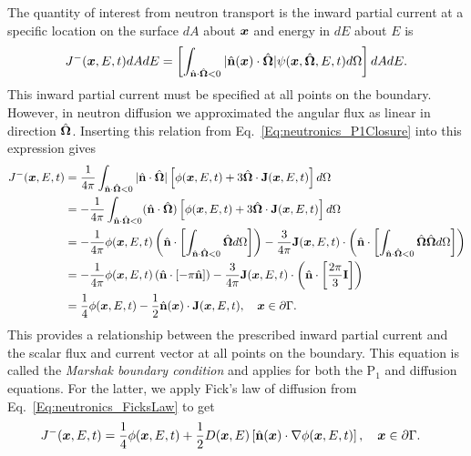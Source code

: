 The quantity of interest from neutron transport is the inward partial current at a specific location on the surface $dA$ about $\bm{x}$ and energy in $dE$ about $E$ is
\begin{align}
  J^-(\bm{x}, E, t) dA dE = \left[ \int_{\hat{\mathbf{n}} \cdot \hat{\mathbf{\Omega}} < 0} | \hat{\mathbf{n}}(\bm{x}) \cdot \hat{\mathbf{\Omega}} | \psi(\bm{x},\hat{\mathbf{\Omega}},E,t) d\Omega \right] dA dE .
\end{align} 
This inward partial current must be specified at all points on the boundary. However, in neutron diffusion we approximated the angular flux as linear in direction $\hat{\mathbf{\Omega}}$. Inserting this relation from Eq.~\eqref{Eq:neutronics_P1Closure} into this expression gives
\begin{align}
  J^-(\bm{x}, E, t) &= \frac{1}{4\pi} \int_{\hat{\mathbf{n}} \cdot \hat{\mathbf{\Omega}} < 0} | \hat{\mathbf{n}} \cdot \hat{\mathbf{\Omega}} |  \left[ \phi(\bm{x},E,t) + 3 \hat{\mathbf{\Omega}} \cdot \mathbf{J}(\bm{x},E,t) \right] d\Omega  \nonumber \\
  &= -\frac{1}{4\pi} \int_{\hat{\mathbf{n}} \cdot \hat{\mathbf{\Omega}} < 0} ( \hat{\mathbf{n}} \cdot \hat{\mathbf{\Omega}} )  \left[ \phi(\bm{x},E,t) + 3 \hat{\mathbf{\Omega}} \cdot \mathbf{J}(\bm{x},E,t) \right] d\Omega  \nonumber \\
  &= -\frac{1}{4\pi} \phi(\bm{x},E,t) \left( \hat{\mathbf{n}} \cdot \left[ \int_{\hat{\mathbf{n}} \cdot \hat{\mathbf{\Omega}} < 0}  \hat{\mathbf{\Omega}} d\Omega \right] \right) -  \frac{3}{4\pi} \mathbf{J}(\bm{x},E,t) \cdot \left( \hat{\mathbf{n}} \cdot  \left[  \int_{\hat{\mathbf{n}} \cdot \hat{\mathbf{\Omega}} < 0} \hat{\mathbf{\Omega}} \hat{\mathbf{\Omega}} d\Omega  \right] \right) \nonumber \\
  &= -\frac{1}{4\pi} \phi(\bm{x},E,t) \left( \hat{\mathbf{n}} \cdot \left[ -\pi \hat{\mathbf{n}} \right] \right) 
  -  \frac{3}{4\pi} \mathbf{J}(\bm{x},E,t) \cdot \left( \hat{\mathbf{n}} \cdot  \left[  \frac{2\pi}{3} \mathbf{I}  \right] \right) \nonumber \\
  &= \frac{1}{4} \phi(\bm{x},E,t) - \frac{1}{2} \hat{\mathbf{n}}(\bm{x}) \cdot \mathbf{J}(\bm{x},E,t) , \quad \bm{x} \in \partial \Gamma .
\end{align} 
This provides a relationship between the prescribed inward partial current and the scalar flux and current vector at all points on the boundary. This equation is called the \emph{Marshak boundary condition} and applies for both the P$_1$ and diffusion equations. For the latter, we apply Fick's law of diffusion from Eq.~\eqref{Eq:neutronics_FicksLaw} to get
\begin{align} \label{Eq:neutronics_MarshakDiffusionBC}
  J^-(\bm{x}, E, t) &= \frac{1}{4} \phi(\bm{x},E,t) + \frac{1}{2} D(\bm{x},E) \left[ \hat{\mathbf{n}}(\bm{x}) \cdot \nabla \phi(\bm{x},E,t) \right], \quad \bm{x} \in \partial \Gamma .
\end{align}

